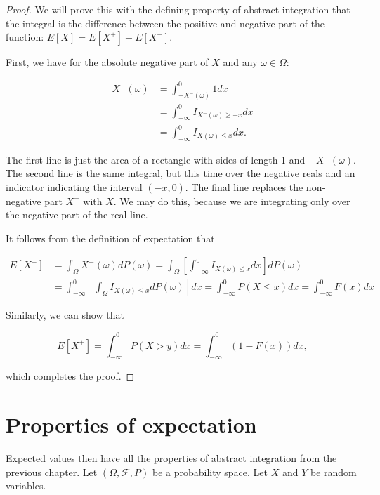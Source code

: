 \documentclass{book}
\theoremstyle{plain}%
\theoremstyle{definition}
\begin{document}
\begin{proof}
We will prove this with the defining property of abstract integration that the integral is the difference between the positive and negative part of the function: $E[X] = E[X^+] - E[X^-]$.

First, we have for the absolute negative part of $X$ and any $\omega \in \Omega$:

\begin{align*}
X^{-}(\omega) &= \int_{-X^-(\omega)}^0 1 dx \\
&= \int_{-\infty}^0 I_{X^-(\omega) \geq -x} dx \\
&= \int_{-\infty}^0 I_{X(\omega) \leq x} dx.
\end{align*}

The first line is just the area of a rectangle with sides of length 1 and $-X^-(\omega)$. The second line is the same integral, but this time over the negative reals and an indicator indicating the interval $(-x, 0)$. The final line replaces the non-negative part $X^-$ with $X$. We may do this, because we are integrating only over the negative part of the real line.

It follows from the definition of expectation that

\begin{align*}
E[X^-] &= \int_\Omega X^-(\omega)dP(\omega) = \int_\Omega  \left[\int_{-\infty}^0 I_{X(\omega) \leq x} dx\right] dP(\omega) \\
&= \int_{-\infty}^0   \left[\int_\Omega I_{X(\omega) \leq x} dP(\omega)\right] dx =  \int_{-\infty}^0 P(X \leq x) dx = \int_{-\infty}^0 F(x) dx
\end{align*}

Similarly, we can show that

$$E[X^+] =  \int_{-\infty}^0 P(X > y) dx = \int_{-\infty}^0 (1 - F(x)) dx,$$

which completes the proof.
\end{proof}

\section{Properties of expectation}

Expected values then have all the properties of abstract integration from the previous chapter. Let $(\Omega, \mathcal{F}, P)$ be a probability space. Let $X$ and $Y$ be random variables.
\end{document}

